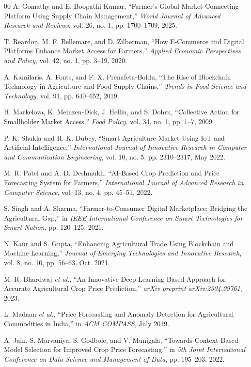 \documentclass[conference]{IEEEtran}
\begin{document}
\begin{thebibliography}{00}
 A. Gomathy and E. Boopathi Kumar, ``Farmer's Global Market Connecting Platform Using Supply Chain Management,'' \emph{World Journal of Advanced Research and Reviews}, vol. 26, no. 1, pp. 1700--1709, 2025.

 T. Reardon, M. F. Bellemare, and D. Zilberman, ``How E-Commerce and Digital Platforms Enhance Market Access for Farmers,'' \emph{Applied Economic Perspectives and Policy}, vol. 42, no. 1, pp. 3--19, 2020.

 A. Kamilaris, A. Fonts, and F. X. Prenafeta-Boldu, ``The Rise of Blockchain Technology in Agriculture and Food Supply Chains,'' \emph{Trends in Food Science and Technology}, vol. 91, pp. 640--652, 2019.

 H. Markelova, K. Meinzen-Dick, J. Hellin, and S. Dohrn, ``Collective Action for Smallholder Market Access,'' \emph{Food Policy}, vol. 34, no. 1, pp. 1--7, 2009.

 P. K. Shukla and R. K. Dubey, ``Smart Agriculture Market Using IoT and Artificial Intelligence,'' \emph{International Journal of Innovative Research in Computer and Communication Engineering}, vol. 10, no. 5, pp. 2310--2317, May 2022.

 M. R. Patel and A. D. Deshmukh, ``AI-Based Crop Prediction and Price Forecasting System for Farmers,'' \emph{International Journal of Advanced Research in Computer Science}, vol. 13, no. 4, pp. 45--51, 2022.

 S. Singh and A. Sharma, ``Farmer-to-Consumer Digital Marketplace: Bridging the Agricultural Gap,'' in \emph{IEEE International Conference on Smart Technologies for Smart Nation}, pp. 120--125, 2021.

 N. Kaur and S. Gupta, ``Enhancing Agricultural Trade Using Blockchain and Machine Learning,'' \emph{Journal of Emerging Technologies and Innovative Research}, vol. 8, no. 10, pp. 56--63, Oct. 2021.

 M. R. Bhardwaj \emph{et al.}, ``An Innovative Deep Learning Based Approach for Accurate Agricultural Crop Price Prediction,'' \emph{arXiv preprint arXiv:2304.09761}, 2023.

 L. Madaan \emph{et al.}, ``Price Forecasting and Anomaly Detection for Agricultural Commodities in India,'' in \emph{ACM COMPASS}, July 2019.

 A. Jain, S. Marvaniya, S. Godbole, and V. Munigala, ``Towards Context-Based Model Selection for Improved Crop Price Forecasting,'' in \emph{5th Joint International Conference on Data Science and Management of Data}, pp. 195--203, 2022.


\end{thebibliography}
\end{document}
